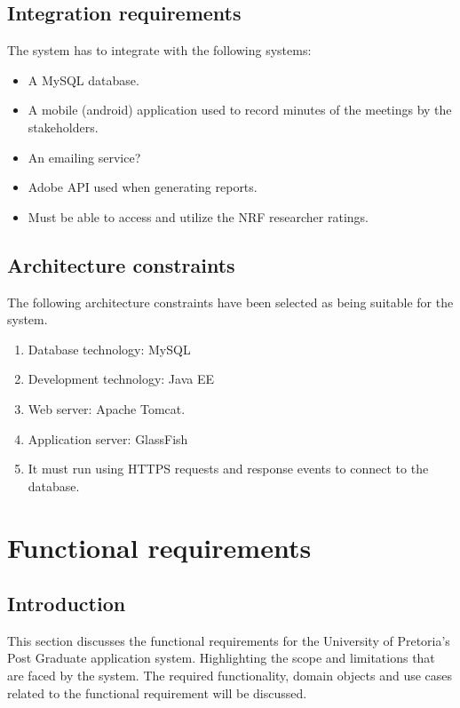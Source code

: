 \documentclass[12pt]{article}
\begin{document}
		\subsection{Integration requirements} %
		\vspace{0.2in}
		The system has to integrate with the following systems:
		\begin{itemize}
			\item A MySQL database.
			\item A mobile (android) application used to record minutes of the meetings by the stakeholders. 
			\item An emailing service? %
			\item Adobe API used when generating reports.
			\item Must be able to access and utilize the NRF researcher ratings.
		\end{itemize}
		\vspace{0.2in}
		
		\subsection{Architecture constraints} %
		\vspace{0.2in}
		The following architecture constraints have been selected as being suitable for the system.
		\begin{enumerate}
			\item Database technology: MySQL
			\item Development technology: Java EE
			\item Web server: Apache Tomcat.
			\item Application server: GlassFish 
			\item It must run using HTTPS requests and response events to connect to the
database.
		\end{enumerate}
		\vspace{0.5in}
	
	\newpage	
	\section{Functional requirements}
		\subsection{Introduction} %
		\vspace{0.2in}
		This section discusses the functional requirements for the University of Pretoria's Post Graduate application system. Highlighting the scope and limitations that are faced by the system. \linebreak \linebreak
		The required functionality, domain objects and use cases related to the functional requirement will be discussed. 
		\vspace{0.2in}
		
\end{document}
